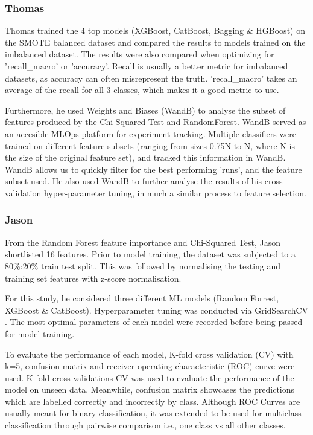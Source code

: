 \documentclass[conference]{IEEEtran}
\begin{document}
\subsubsection{Thomas}

Thomas trained the 4 top models (XGBoost, CatBoost, Bagging \& HGBoost) on the SMOTE balanced dataset and compared the results to models trained on the imbalanced dataset. The results were also compared when optimizing for 'recall\_macro' or 'accuracy'. Recall is usually a better metric for imbalanced datasets, as accuracy can often misrepresent the truth. 'recall\_macro' takes an average of the recall for all 3 classes, which makes it a good metric to use.

Furthermore, he used Weights and Biases (WandB) \cite{wandb} to analyse the subset of features produced by the Chi-Squared Test and RandomForest. WandB served as an accesible MLOps platform for experiment tracking. Multiple classifiers were trained on different feature subsets (ranging from sizes 0.75N to N, where N is the size of the original feature set), and tracked this information in WandB. WandB allows us to quickly filter for the best performing 'runs', and the feature subset used. He also used WandB to further analyse the results of his cross-validation hyper-parameter tuning, in much a similar process to feature selection.

\subsubsection{Jason}

From the Random Forest feature importance and Chi-Squared Test, Jason shortlisted 16 features. Prior to model training, the dataset was subjected to a 80\%:20\% train test split. This was followed by normalising the testing and training set features with z-score normalisation.

For this study, he considered three different ML models  (Random Forrest, XGBoost \& CatBoost). Hyperparameter tuning was conducted via GridSearchCV \cite{gridsearch}. The most optimal parameters of each model were recorded before being passed for model training. 

To evaluate the performance of each model, K-fold cross validation (CV) with k=5, confusion matrix and receiver operating characteristic (ROC) curve were used. K-fold cross validations CV was used to evaluate the performance of the model on unseen data. Meanwhile, confusion matrix showcases the predictions which are labelled correctly and incorrectly by class. Although ROC Curves are usually meant for binary classification, it was extended to  be used for multiclass classification through pairwise comparison i.e., one class vs all other classes.   
\end{document}
